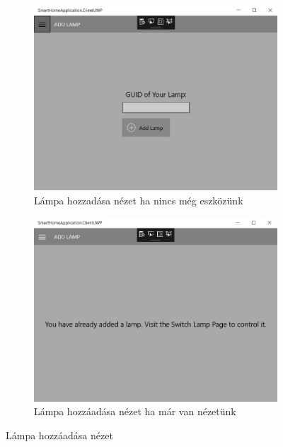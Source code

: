 \documentclass[a4paper,12pt]{report}
\begin{document}
\begin{figure}[h!]
    \centering
    \begin{subfigure}[b]{0.4\linewidth}
        \includegraphics[width=\linewidth]{images/addlampview.jpg}
        \caption{Lámpa hozzadása nézet ha nincs még eszközünk}
    \end{subfigure}
    \begin{subfigure}[b]{0.4\linewidth}
        \includegraphics[width=\linewidth]{images/alreadyhaslamp.jpg}
        \caption{Lámpa hozzáadása nézet ha már van nézetünk}
    \end{subfigure}
    \caption{Lámpa hozzáadása nézet}
    \label{fig:AddLampView}
\end{figure}
\end{document}
